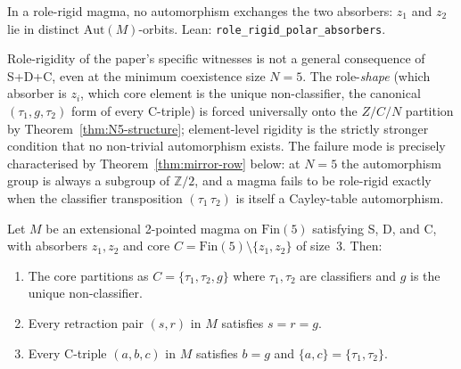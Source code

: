 \documentclass[sigconf,screen]{acmart}
\newcommand{\Fin}{\mathrm{Fin}}
\theoremstyle{remark}
\begin{document}
\begin{corollary}
\label{cor:polar-absorbers}
In a role-rigid magma, no automorphism exchanges the two absorbers: $z_1$ and $z_2$ lie in distinct $\mathrm{Aut}(M)$-orbits. Lean: \texttt{role\_rigid\_polar\_absorbers}.
\end{corollary}

Role-rigidity of the paper's specific witnesses is not a general consequence of S+D+C, even at the minimum coexistence size $N\!=\!5$. The role-\emph{shape} (which absorber is $z_i$, which core element is the unique non-classifier, the canonical $(\tau_1, g, \tau_2)$ form of every C-triple) is forced universally onto the $Z/C/N$ partition by Theorem~\ref{thm:N5-structure}; element-level rigidity is the strictly stronger condition that no non-trivial automorphism exists. The failure mode is precisely characterised by Theorem~\ref{thm:mirror-row} below: at $N\!=\!5$ the automorphism group is always a subgroup of $\mathbb{Z}/2$, and a magma fails to be role-rigid exactly when the classifier transposition $(\tau_1\,\tau_2)$ is itself a Cayley-table automorphism.

\begin{theorem}[Structure Theorem at $N\!=\!5$]
\label{thm:N5-structure}
Let $M$ be an extensional 2-pointed magma on $\Fin(5)$ satisfying S, D, and C, with absorbers $z_1, z_2$ and core $C = \Fin(5) \setminus \{z_1, z_2\}$ of size~3. Then:
\begin{enumerate}
  \item The core partitions as $C = \{\tau_1, \tau_2, g\}$ where $\tau_1, \tau_2$ are classifiers and $g$ is the unique non-classifier.
  \item Every retraction pair $(s, r)$ in $M$ satisfies $s = r = g$.
  \item Every C-triple $(a, b, c)$ in $M$ satisfies $b = g$ and $\{a, c\} = \{\tau_1, \tau_2\}$.
\end{enumerate}
\end{theorem}
\end{document}

